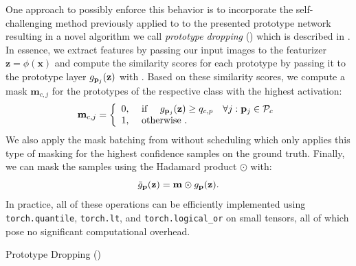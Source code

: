 One approach to possibly enforce this behavior is to incorporate the self-challenging method previously applied to \divcam to the presented prototype network resulting in a novel algorithm we call \emph{prototype dropping} (\prodrop) which is described in . In essence, we extract features by passing our input images to the featurizer $\mathbf{z} = \phi(\mathbf{x})$ and compute the similarity scores for each prototype by passing it to the prototype layer $g_{\mathbf{p}_{j}}(\mathbf{z})$ with . Based on these similarity scores, we compute a mask $\mathbf{m}_{c,j}$ for the prototypes of the respective class with the highest activation:
\begin{equation}
\mathbf{m}_{c,j}=\left\{\begin{array}{ll}
0, & \text { if } \quad g_{\mathbf{p}_{j}}(\mathbf{z}) \geq q_{c, p}\quad \forall j: \mathbf{p}_{j} \in \mathcal{P}_c \\
1, & \text { otherwise }.
\end{array}\right.
\label{eq:ProDropFeatureMask}
\end{equation}
We also apply the mask batching from \divcam without scheduling which only applies this type of masking for the highest confidence samples on the ground truth. Finally, we can mask the samples using the Hadamard product $\odot$ with:
\begin{equation}
\label{eq:mutate_prodrop}
\Tilde{g}_{\mathbf{p}}(\mathbf{z}) = \mathbf{m} \odot g_{\mathbf{p}}(\mathbf{z}).
\end{equation}
In practice, all of these operations can be efficiently implemented using \texttt{torch.quantile}, \texttt{torch.lt}, and \texttt{torch.logical\_or} on small tensors, all of which pose no significant computational overhead.

\begin{algorithm}[t]
    \SetAlgoLined
    \BlankLine
\caption{Prototype Dropping (\prodrop)}
\label{alg:ProDrop}
\end{algorithm}


